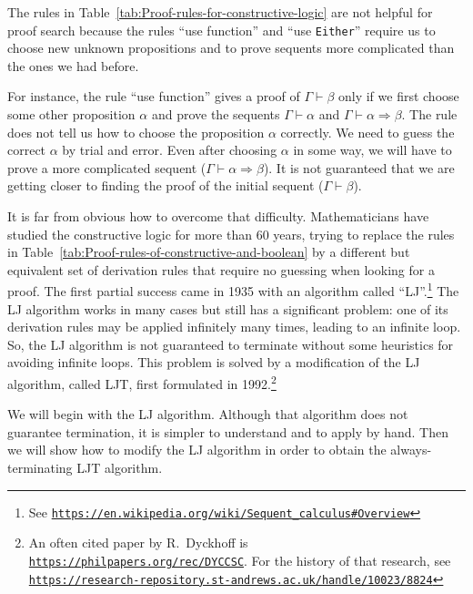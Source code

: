 The rules in Table~\ref{tab:Proof-rules-for-constructive-logic}
are not helpful for proof search because the rules \textsf{``}use function\textsf{''}
and \textsf{``}use \lstinline!Either!\textsf{''} require us to choose new unknown
propositions and to prove sequents more complicated than the ones
we had before. 

For instance, the rule \textsf{``}use function\textsf{''} gives a proof of $\Gamma\vdash\beta$
only if we first choose some other proposition $\alpha$ and prove
the sequents $\Gamma\vdash\alpha$ and $\Gamma\vdash\alpha\Rightarrow\beta$.
The rule does not tell us how to choose the proposition $\alpha$
correctly. We need to guess the correct $\alpha$ by trial and error.
Even after choosing $\alpha$ in some way, we will have to prove a
more complicated sequent ($\Gamma\vdash\alpha\Rightarrow\beta$).
It is not guaranteed that we are getting closer to finding the proof
of the initial sequent ($\Gamma\vdash\beta$). 

It is far from obvious how to overcome that difficulty. Mathematicians
have studied the constructive logic for more than 60 years, trying
to replace the rules in Table~\ref{tab:Proof-rules-of-constructive-and-boolean}
by a different but equivalent set of derivation rules that require
no guessing when looking for a proof. The first partial success came
in 1935 with an algorithm called \textsf{``}LJ\textsf{''}.\footnote{See \texttt{\href{https://en.wikipedia.org/wiki/Sequent_calculus\#Overview}{https://en.wikipedia.org/wiki/Sequent\_calculus\#Overview}}}
The LJ algorithm works in many cases but still has a significant problem:
one of its derivation rules may be applied infinitely many times,
leading to an infinite loop. So, the LJ algorithm is not guaranteed
to terminate without some heuristics for avoiding infinite loops.
This problem is solved by a modification of the LJ algorithm, called
LJT, first formulated in 1992.\footnote{An often cited paper by R.~Dyckhoff is \texttt{\href{https://philpapers.org/rec/DYCCSC}{https://philpapers.org/rec/DYCCSC}}.
For the history of that research, see \texttt{\href{https://research-repository.st-andrews.ac.uk/handle/10023/8824}{https://research-repository.st-andrews.ac.uk/handle/10023/8824}}} 

We will begin with the LJ algorithm. Although that algorithm does
not guarantee termination, it is simpler to understand and to apply
by hand. Then we will show how to modify the LJ algorithm in order
to obtain the always-terminating LJT algorithm.

